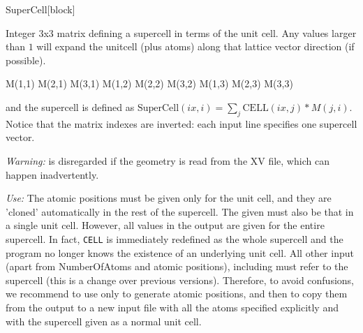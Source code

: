 \begin{fdfentry}{SuperCell}[block]

  Integer 3x3 matrix defining a supercell in terms of the unit cell.
  Any values larger than $1$ will expand the unitcell (plus atoms)
  along that lattice vector direction (if possible).
  \begin{fdfexample}
        M(1,1)  M(2,1)  M(3,1) 
        M(1,2)  M(2,2)  M(3,2) 
        M(1,3)  M(2,3)  M(3,3) 
  \end{fdfexample}
  and the supercell is defined as
  $\mathrm{SuperCell}(ix,i) = \sum_j \mathrm{CELL}(ix,j)*M(j,i)$.
  Notice that the matrix indexes are inverted: each input line
  specifies one supercell vector.

  \textit{Warning:}  is disregarded if the geometry is
  read from the XV file, which can happen inadvertently.

  \textit{Use:} The atomic positions must be given only for the unit
  cell, and they are 'cloned' automatically in the rest of the
  supercell. The  given must also be that in a
  single unit cell. However, all values in the output are given for
  the entire supercell. In fact, \texttt{CELL} is immediately
  redefined as the whole supercell and the program no longer knows the
  existence of an underlying unit cell.  All other input (apart from
  NumberOfAtoms and atomic positions), including
   must refer to the supercell (this is a
  change over previous versions). Therefore, to avoid confusions, we
  recommend to use  only to generate atomic positions,
  and then to copy them from the output to a new input file with all
  the atoms specified explicitly and with the supercell given as a
  normal unit cell.
  
\end{fdfentry}

